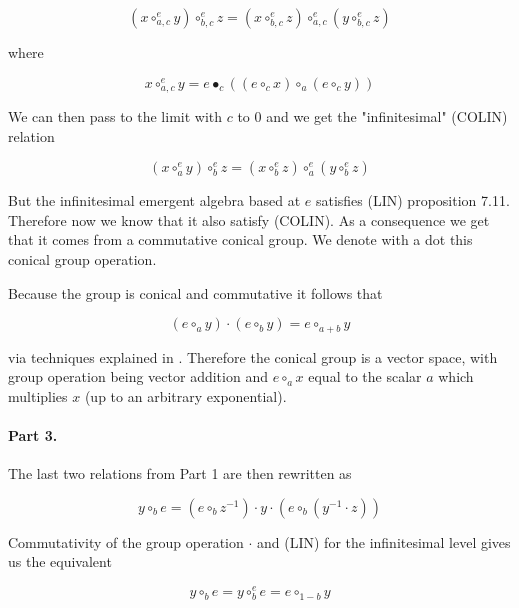\documentclass{article}
\begin{document}
 $$ (x \circ_{a,c}^{e} y) \circ_{b,c}^{e} z = (x \circ_{b,c}^{e} z) \circ_{a,c}^{e} (y \circ_{b,c}^{e} z)$$



where 



$$ x \circ_{a,c}^{e} y = e \bullet_{c} ((e \circ_{c} x) \circ_{a} (e \circ_{c} y))$$



We can then pass to the limit with $c$ to $0$ and we get the "infinitesimal" (COLIN) relation 



$$ (x \circ_{a}^{e} y) \circ_{b} ^{e}z = (x \circ_{b}^{e}z) \circ_{a}^{e} (y \circ_{b}^{e} z)$$



But the infinitesimal emergent algebra based at $e$ satisfies (LIN) \cite{buligainf} proposition 7.11. Therefore now we know that it also satisfy (COLIN). As a consequence we get that it comes from a commutative conical group. We denote with a dot this conical group operation. 



Because the group is conical and commutative it follows that 



$$ (e \circ_{a} y) \cdot (e \circ_{b} y)  = e \circ_{a + b} y$$



via techniques explained in \cite{buligaem}. Therefore the conical group is a vector space, with group operation being vector addition and $e \circ_{a} x$ equal to the  scalar $a$ which multiplies $x$ (up to an arbitrary exponential). 



\paragraph{Part 3. }The last two relations from Part 1 are then rewritten as 



$$ y \circ_{b} e = (e \circ_{b} z^{-1})  \cdot y \cdot (e \circ_{b} (y^{-1}  \cdot z))$$



Commutativity of the group operation $\cdot$ and (LIN) for the infinitesimal level gives us the equivalent 



$$ y \circ_{b} e = y \circ_{b}^{e} e = e \circ_{1-b} y$$
\end{document}
